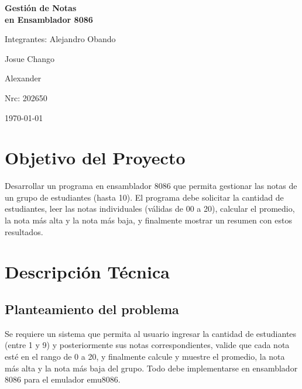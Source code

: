 \documentclass[12pt,a4paper]{article}
\begin{document}
\begin{titlepage}
    \centering
    \vspace*{3cm}
    {\Huge \bfseries Gesti\'on de Notas\\[0.5cm]
    en Ensamblador 8086\par}
    \vspace{2cm}
    {\Large Integrantes: Alejandro Obando\par}
    {\Large                               Josue Chango\par}
    {\Large                               Alexander\par}
    \vspace{1cm}
    {\Large Nrc: 202650\par}

    \vspace{2cm}
    {\large \today\par}
    \vfill
\end{titlepage}

\section{Objetivo del Proyecto}

Desarrollar un programa en ensamblador 8086 que permita gestionar las notas de un grupo de estudiantes (hasta 10). El programa debe solicitar la cantidad de estudiantes, leer las notas individuales (v\'alidas de 00 a 20), calcular el promedio, la nota m\'as alta y la nota m\'as baja, y finalmente mostrar un resumen con estos resultados.

\section{Descripci\'on T\'ecnica}

\subsection{Planteamiento del problema}

Se requiere un sistema que permita al usuario ingresar la cantidad de estudiantes (entre 1 y 9) y posteriormente sus notas correspondientes, valide que cada nota est\'e en el rango de 0 a 20, y finalmente calcule y muestre el promedio, la nota m\'as alta y la nota m\'as baja del grupo. Todo debe implementarse en ensamblador 8086 para el emulador emu8086.
\end{document}
